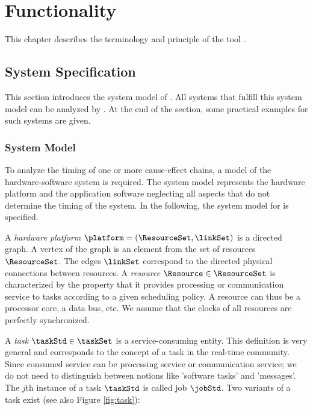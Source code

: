 \section{Functionality}
\label{sec:functionality}
%
This chapter describes the terminology and principle of the tool \Tool.


\subsection{System Specification}
\label{sec:inputs}
This section introduces the system model of \Tool.
All systems that fulfill this system model can be analyzed by \Tool.
At the end of the section, some practical examples for such systems are given.


\subsubsection{System Model}
\label{sec:system-model}
To analyze the timing of one or more cause-effect chains, a model of the hardware-software system is required. 
The system model represents the hardware platform and the application software neglecting all aspects that do not determine the timing of the system. 
In the following, the system model for \Tool is specified.
\bigskip

A \emph{hardware platform} $\platform = (\ResourceSet, \linkSet)$ is a directed graph.
A vertex of the graph is an element from the set of resources $\ResourceSet$.
The edges $\linkSet$ correspond to the directed physical connections between resources.
%
A \emph{resource} $\Resource \in \ResourceSet$ is characterized by the property that it provides processing or communication service to tasks according to a given scheduling policy. 
A resource can thus be a processor core, a data bus, etc.  
We assume that the clocks of all resources are perfectly synchronized. 

A \emph{task} $\taskStd \in \taskSet$ is a service-consuming entity. 
This definition is very general and corresponds to the concept of a task in the real-time community.
Since consumed service can be processing service or communication service; we do not need to distinguish between notions like 'software tasks' and 'messages'. 
The $j$th instance of a task $\taskStd$ is called job $\jobStd$.
Two variants of a task exist (see also Figure \ref{fig:task}): 
\bigskip

